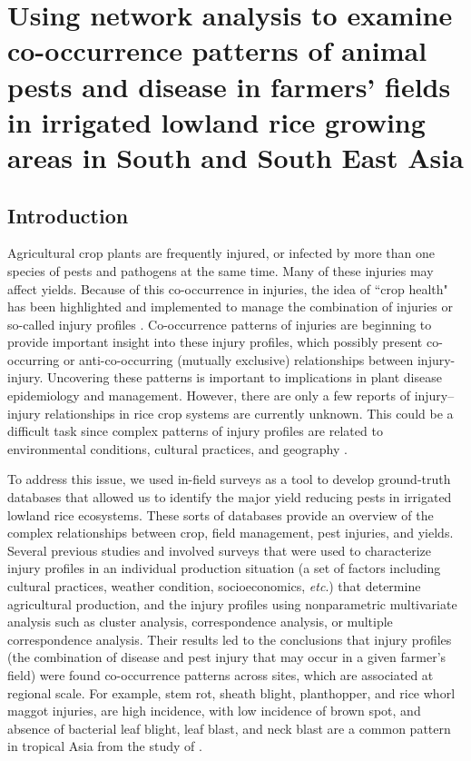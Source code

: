 \section{Using network analysis to examine co-occurrence patterns of animal pests and disease in farmers' fields in irrigated lowland rice growing areas in South and South East Asia}

\subsection{Introduction}

Agricultural crop plants are frequently injured, or infected by more than one species of pests and pathogens at the same time. Many of these injuries may affect yields. Because of this co-occurrence in injuries, the idea of ``crop health" has been highlighted and implemented to manage the combination of injuries or so-called injury profiles \citep{Savary_2006_Quantification}. Co-occurrence patterns of injuries are beginning to provide important insight into these injury profiles, which possibly present co-occurring or anti-co-occurring (mutually exclusive) relationships between injury-injury. Uncovering these patterns is important to implications in plant disease epidemiology and management. However, there are only a few reports of injury–injury relationships in rice crop systems are currently unknown. This could be a difficult task since complex patterns of injury profiles are related to environmental conditions, cultural practices, and geography \citep{Willocquet_2008_Simulating}.

To address this issue, we used in-field surveys as a tool to develop ground-truth databases that allowed us to identify the major yield reducing pests in irrigated lowland rice ecosystems. These sorts of databases provide an overview of the complex relationships between crop, field management, pest injuries, and yields. Several previous studies \citet{Savary_2000_Quantification, Savary_2000_Characterization, Dong_2010_Characterization} and \citet{Reddy_2011_Characterizing} involved surveys that were used to characterize injury profiles in an individual production situation (a set of factors including cultural practices, weather condition, socioeconomics, \textit{etc}.) that determine agricultural production, and the injury profiles using nonparametric multivariate analysis such as cluster analysis, correspondence analysis, or multiple correspondence analysis. Their results led to the conclusions that injury profiles (the combination of disease and pest injury that may occur in a given farmer’s field) were found co-occurrence patterns across sites, which are associated at regional scale. For example, stem rot, sheath blight, planthopper, and rice whorl maggot injuries, are high incidence, with low incidence of brown spot, and absence of bacterial leaf blight, leaf blast, and neck blast are a common pattern in tropical Asia from the study of \citet{Savary_2000_Characterization}.

